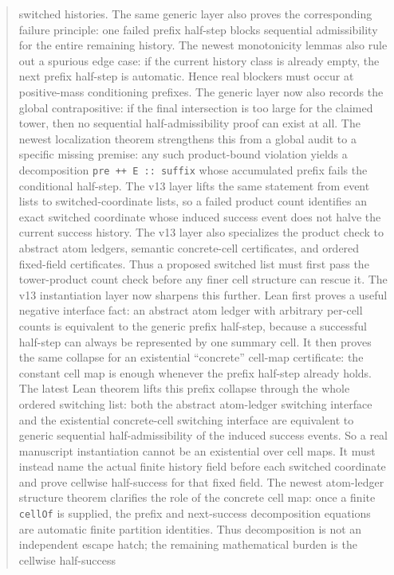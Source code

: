 \documentclass[11pt]{article}
\theoremstyle{remark}
\begin{document}
\begin{abstract}
switched histories.  The same generic layer also proves the corresponding failure principle: one
failed prefix half-step blocks sequential admissibility for the entire remaining history.  The
newest monotonicity lemmas also rule out a spurious edge case: if the current history class is
already empty, the next prefix half-step is automatic.  Hence real blockers must occur at
positive-mass conditioning prefixes.  The generic layer now also records the global contrapositive:
if the final intersection is too large for the claimed tower, then no sequential half-admissibility
proof can exist at all.  The newest localization theorem strengthens this from a global audit to a
specific missing premise: any such product-bound violation yields a decomposition
\texttt{pre ++ E :: suffix} whose accumulated prefix fails the conditional half-step.  The v13
layer lifts the same statement from event lists to switched-coordinate lists, so a failed product
count identifies an exact switched coordinate whose induced success event does not halve the
current success history.  The v13 layer also specializes the product check to abstract atom
ledgers, semantic concrete-cell certificates, and ordered fixed-field certificates.  Thus a proposed
switched list must first pass the tower-product count check before any finer cell structure can
rescue it.  The v13 instantiation layer now sharpens this further.
Lean first proves a useful negative interface fact: an abstract atom ledger with arbitrary
per-cell counts is equivalent to the generic prefix half-step, because a successful half-step can
always be represented by one summary cell.  It then proves the same collapse for an existential
``concrete'' cell-map certificate: the constant cell map is enough whenever the prefix half-step
already holds.  The latest Lean theorem lifts this prefix collapse through the whole ordered
switching list: both the abstract atom-ledger switching interface and the existential concrete-cell
switching interface are equivalent to generic sequential half-admissibility of the induced success
events.  So a real manuscript instantiation cannot be an existential over cell maps.  It must
instead name the actual finite history field before each switched coordinate and prove cellwise
half-success for that fixed field.  The newest atom-ledger structure theorem clarifies
the role of the concrete cell map: once a finite \texttt{cellOf} is supplied, the prefix and
next-success decomposition equations are automatic finite partition identities.  Thus decomposition
is not an independent escape hatch; the remaining mathematical burden is the cellwise half-success

\end{abstract}
\end{document}
